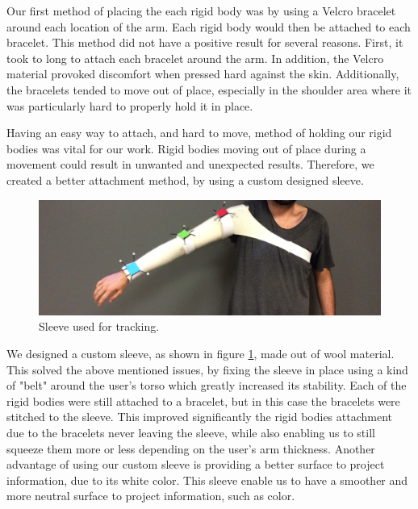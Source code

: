 Our first method of placing the each rigid body was by using a Velcro bracelet around each location of the arm. 
Each rigid body would then be attached to each bracelet. This method did not have a positive result for several reasons. 
First, it took to long to attach each bracelet around the arm. In addition, the Velcro material provoked discomfort when pressed hard against the skin. 
Additionally, the bracelets tended to move out of place, especially in the shoulder area where it was particularly hard to properly hold it in place.

Having an easy way to attach, and hard to move, method of holding our rigid bodies was vital for our work. 
Rigid bodies moving out of place during a movement could result in unwanted and unexpected results. 
Therefore, we created a better attachment method, by using a custom designed sleeve.


\begin{figure}[!t]
    \begin{center}
        \includegraphics[width=\textwidth]{imgs/impl/sleevewearable}
    \end{center}
    \caption{Sleeve used for tracking.}
    \label{fig:sleevewearable}
\end{figure}

We designed a custom sleeve, as shown in figure \ref{fig:sleevewearable}, made out of wool material. 
This solved the above mentioned issues, by fixing the sleeve in place using a kind of "belt" around the user's torso which greatly increased its stability. 
Each of the rigid bodies were still attached to a bracelet, but in this case the bracelets were stitched to the sleeve. 
This improved significantly the rigid bodies attachment due to the bracelets never leaving the sleeve, 
while also enabling us to still squeeze them more or less depending on the user's arm thickness.
Another advantage of using our custom sleeve is providing a better surface to project information, due to its white color. This sleeve enable us to have a smoother and more neutral surface to project information, such as color.  

